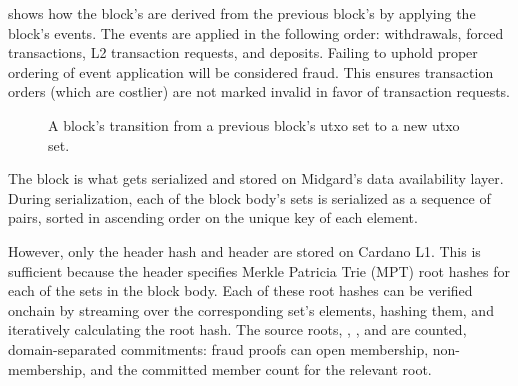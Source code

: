 \documentclass[../midgard.tex]{subfiles}
\begin{document}
 shows how the block's  are derived from the previous block's  by applying the block's events.
The events are applied in the following order: withdrawals, forced transactions, L2 transaction requests, and deposits.
Failing to uphold proper ordering of event application will be considered fraud.
This ensures transaction orders (which are costlier) are not marked invalid in favor of transaction requests.

\begin{figure}[htb] %
    \centering %
    \caption[Block transition]{A block's transition from a previous block's utxo set to a new utxo set.}
    \label{fig:block-transition}
\end{figure}

The block is what gets serialized and stored on Midgard's data availability layer.
During serialization, each of the block body's sets is serialized as a sequence of pairs, sorted in ascending order on the unique key of each element.

However, only the header hash and header are stored on Cardano L1.
This is sufficient because the header specifies Merkle Patricia Trie (MPT) root hashes for each of the sets in the block body.
Each of these root hashes can be verified onchain by streaming over the corresponding set's elements, hashing them, and iteratively calculating the root hash.
The source roots, , , and  are counted, domain-separated commitments: fraud proofs can open membership, non-membership, and the committed member count for the relevant root.
\end{document}
